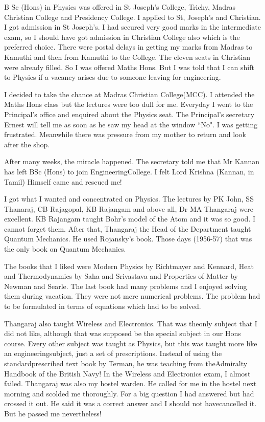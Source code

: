 B Sc (Hons) in Physics was offered in St Joseph's College, Trichy, 
Madras Christian College and Presidency College. I applied to St, 
Joseph's and Christian. I got admission in St Joseph's. I had secured 
very good marks in the intermediate exam, so I should have got admission 
in Christian College also which is the preferred choice.  There were 
postal delays in getting my marks from Madras to Kamuthi and then from 
Kamuthi to the College. The eleven seats in Christian were already 
filled. So I was offered Maths Hons. But I was told that I can shift to 
Physics if a vacancy arises due to someone leaving for engineering.

I decided to take the chance at Madras Christian College\break  (MCC). I 
attended the Maths Hons class but the lectures were too dull for me. 
Everyday I went to the Principal's office and enquired about the Physics 
seat. The Principal's secretary Ernest will tell me as soon as he saw my 
head at the window ``No". I was getting frustrated. Meanwhile there was 
pressure from my mother to return and look after the shop.

After many weeks, the miracle happened. The secretary told me that Mr 
Kannan has left BSc (Hons) to join Engineering\break College. I felt Lord 
Krishna (Kannan, in Tamil) Himself came and rescued me!

I got what I wanted and concentrated on Physics. The lectu\-res by PK 
John, SS Thanaraj, CB Rajagopal, KB Rajangam and above all, Dr MA 
Thangaraj were excellent. KB Rajangam taught Bohr's model of the Atom 
and it was so good. I cannot forget them. After that, Thangaraj the Head 
of the Department taught Quantum Mechanics. He used Rojansky's book. 
Those days (1956-57) that was the only book on Quantum Mechanics.

The books that I liked were Modern Physics by Richtmayer and Kennard, 
Heat and Thermodynamics by Saha and Srivastava and Properties of Matter 
by Newman and Searle. The last book had many problems and I enjoyed 
solving them during vacation. They were not mere numerical problems. The 
problem had to be formulated in terms of equations which had to be 
solved.

Thangaraj also taught Wireless and Electronics. That was the\break only 
subject that I did not like, although that was supposed be the special 
subject in our Hons course. Every other subject was taught as Physics, 
but this was taught more like an engineering\break subject, just a set of 
prescriptions. Instead of using the standard\break prescribed text book by 
Terman, he was teaching from the\break Admiralty Handbook of the British Navy! 
In the Wireless and Electronics exam, I almost failed. Thangaraj was 
also my hostel warden. He called for me in the hostel next morning and 
scolded me thoroughly. For a big question I had answered but had crossed 
it out. He said it was a correct answer and I should not have\break cancelled 
it. But he passed me nevertheless!

